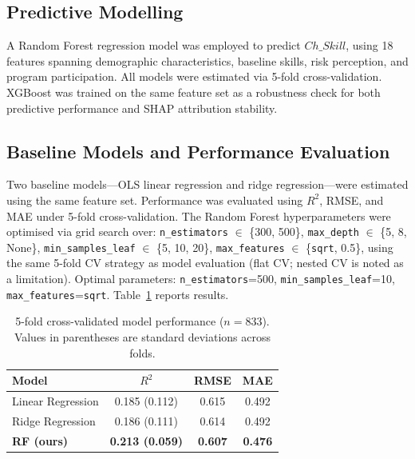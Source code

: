 \documentclass[3p,twocolumn,authoryear]{elsarticle}
\begin{document}
\subsection{Predictive Modelling}

A Random Forest regression model \citep{breiman2001} was employed to
predict $Ch\_Skill$, using 18 features spanning demographic
characteristics, baseline skills, risk perception, and program
participation.
All models were estimated via 5-fold cross-validation.
XGBoost \citep{chen2016} was trained on the same feature set as a
robustness check for both predictive performance and SHAP attribution
stability.

\subsection{Baseline Models and Performance Evaluation}

Two baseline models---OLS linear regression and ridge regression---were
estimated using the same feature set.
Performance was evaluated using $R^{2}$, RMSE, and MAE under 5-fold
cross-validation.
The Random Forest hyperparameters were optimised via grid search over:
\texttt{n\_estimators} $\in$ \{300, 500\}, \texttt{max\_depth}
$\in$ \{5, 8, None\}, \texttt{min\_samples\_leaf} $\in$ \{5, 10, 20\},
\texttt{max\_features} $\in$ \{\texttt{sqrt}, 0.5\}, using the same
5-fold CV strategy as model evaluation (flat CV; nested CV is noted as
a limitation).
Optimal parameters: \texttt{n\_estimators}=500,
\texttt{min\_samples\_leaf}=10, \texttt{max\_features}=\texttt{sqrt}.
Table~\ref{tab:baseline_performance} reports results.

\begin{table}[htbp]
\centering
\caption{5-fold cross-validated model performance ($n = 833$).
         Values in parentheses are standard deviations across folds.}
\label{tab:baseline_performance}
\begin{tabular}{@{}lccc@{}}
\toprule
\textbf{Model} & \textbf{$R^{2}$} & \textbf{RMSE} & \textbf{MAE} \\
\midrule
Linear Regression  & 0.185 (0.112) & 0.615 & 0.492 \\
Ridge Regression   & 0.186 (0.111) & 0.614 & 0.492 \\
\textbf{RF (ours)} & \textbf{0.213 (0.059)} & \textbf{0.607} & \textbf{0.476} \\
\bottomrule
\end{tabular}
\end{table}
\end{document}
